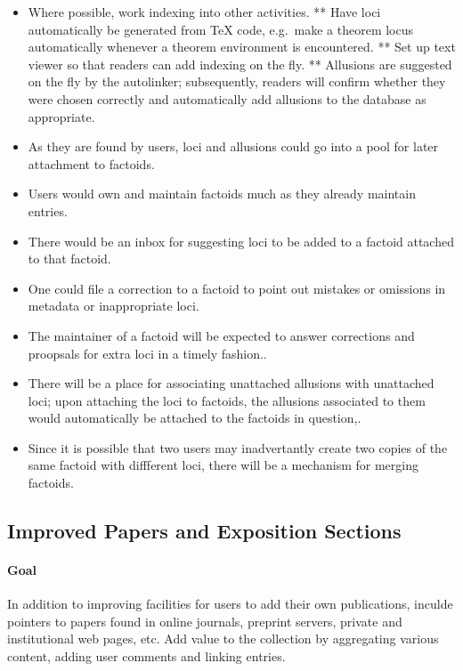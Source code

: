 \begin{itemize}
\item
  Where possible, work indexing into other activities. ** Have loci
  automatically be generated from TeX code, e.g.~make a theorem locus
  automatically whenever a theorem environment is encountered. ** Set up
  text viewer so that readers can add indexing on the fly. ** Allusions
  are suggested on the fly by the autolinker; subsequently, readers will
  confirm whether they were chosen correctly and automatically add
  allusions to the database as appropriate.
\item
  As they are found by users, loci and allusions could go into a pool
  for later attachment to factoids.
\item
  Users would own and maintain factoids much as they already maintain
  entries.
\item
  There would be an inbox for suggesting loci to be added to a factoid
  attached to that factoid.
\item
  One could file a correction to a factoid to point out mistakes or
  omissions in metadata or inappropriate loci.
\item
  The maintainer of a factoid will be expected to answer corrections and
  proopsals for extra loci in a timely fashion..
\item
  There will be a place for associating unattached allusions with
  unattached loci; upon attaching the loci to factoids, the allusions
  associated to them would automatically be attached to the factoids in
  question,.
\item
  Since it is possible that two users may inadvertantly create two
  copies of the same factoid with diffferent loci, there will be a
  mechanism for merging factoids.
\end{itemize}

\subsection{Improved Papers and Exposition Sections}

\paragraph{Goal} In addition to improving facilities for users to add their own
publications, inculde pointers to papers found in online journals,
preprint servers, private and institutional web pages, etc. Add value to
the collection by aggregating various content, adding user comments and
linking entries.

